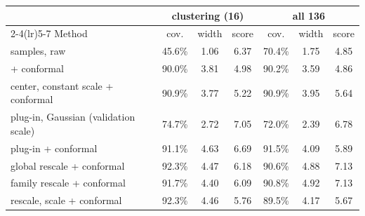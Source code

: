 \begin{tabular}{@{}p{2.55in}cccccc@{}}
\toprule
 & \multicolumn{3}{c}{clustering (16)} & \multicolumn{3}{c}{all 136} \\
\cmidrule(lr){2-4}\cmidrule(lr){5-7}
Method & cov. & width & score & cov. & width & score \\
\midrule
\method{} samples, raw & 45.6\% & 1.06 & 6.37 & 70.4\% & 1.75 & 4.85 \\
\method{} + conformal & 90.0\% & 3.81 & 4.98 & 90.2\% & 3.59 & 4.86 \\
\method{} center, constant scale + conformal & 90.9\% & 3.77 & 5.22 & 90.9\% & 3.95 & 5.64 \\
plug-in, Gaussian (validation scale) & 74.7\% & 2.72 & 7.05 & 72.0\% & 2.39 & 6.78 \\
plug-in + conformal & 91.1\% & 4.63 & 6.69 & 91.5\% & 4.09 & 5.89 \\
global rescale + conformal & 92.3\% & 4.47 & 6.18 & 90.6\% & 4.88 & 7.13 \\
family rescale + conformal & 91.7\% & 4.40 & 6.09 & 90.8\% & 4.92 & 7.13 \\
rescale, \method{} scale + conformal & 92.3\% & 4.46 & 5.76 & 89.5\% & 4.17 & 5.67 \\
\bottomrule
\end{tabular}
